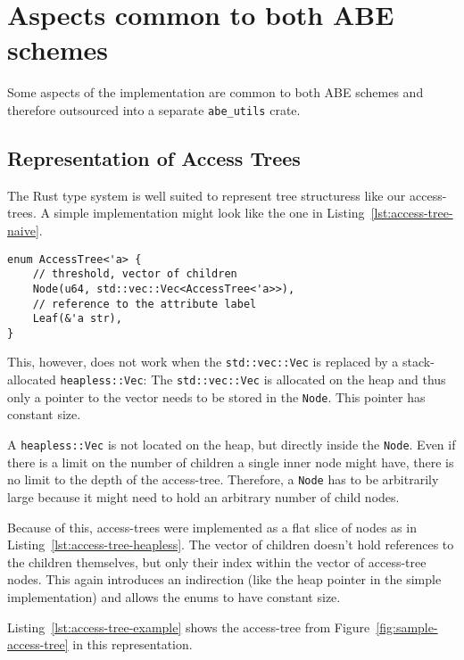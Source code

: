 \section{Aspects common to both ABE schemes}

Some aspects of the implementation are common to both ABE schemes and therefore outsourced into a separate \verb+abe_utils+ \gls{crate}.

\subsection{Representation of Access Trees}
The Rust type system is well suited to represent tree structuress like our \glspl{access-tree}.
A simple implementation might look like the one in Listing~\ref{lst:access-tree-naive}. 

\begin{lstlisting}[float=h,caption={Simple Implementation of \glspl{access-tree} (using the standard library)},label={lst:access-tree-naive}]
enum AccessTree<'a> {
    // threshold, vector of children
    Node(u64, std::vec::Vec<AccessTree<'a>>),
    // reference to the attribute label
    Leaf(&'a str),
}
\end{lstlisting}

This, however, does not work when the \texttt{std::vec::Vec} is replaced by a stack-allocated \texttt{heapless::Vec}:
The \texttt{std::vec::Vec} is allocated on the heap and thus only a pointer to the vector needs to be stored in the \texttt{Node}.
This pointer has constant size.

A \texttt{heapless::Vec} is not located on the heap, but directly inside the \texttt{Node}.
Even if there is a limit on the number of children a single inner node might have, there is no limit to the depth of the \gls{access-tree}.
Therefore, a \texttt{Node} has to be arbitrarily large because it might need to hold an arbitrary number of child nodes.

Because of this, \glspl{access-tree} were implemented as a flat \gls{slice} of nodes as in Listing~\ref{lst:access-tree-heapless}. 
The vector of children doesn't hold references to the children themselves, but only their index within the vector of \gls{access-tree} nodes.
This again introduces an indirection (like the heap pointer in the simple implementation) and allows the enums to have constant size.

Listing~\ref{lst:access-tree-example} shows the \gls{access-tree} from Figure~\ref{fig:sample-access-tree} in this representation.


